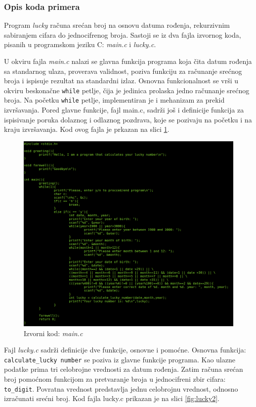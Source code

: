 \documentclass[12pt,oneside]{memoir}
\newcommand{\kod}[1]{\texttt{#1}}
\newcommand{\strano}[1]{\textit{#1}}
\begin{document}
\subsubsection{Opis koda primera}

Program \strano{lucky} računa srećan broj na osnovu datuma rođenja, rekurzivnim sabiranjem cifara do jednocifrenog broja. Sastoji se iz dva fajla izvornog koda, pisanih u programskom jeziku C: \strano{main.c} i \strano{lucky.c}. 

U okviru fajla \strano{main.c} nalazi se glavna funkcija programa koja čita datum rođenja sa standarnog ulaza, proverava validnost, poziva funkciju za računanje srećnog broja i ispisuje rezultat na standardni izlaz. Osnovna funkcionalnost se vrši u okviru beskonačne \kod{while} petlje, čija je jedinica prolaska jedno računanje srećnog broja. Na početku \kod{while} petlje, implementiran je i mehanizam za prekid izvršavanja. Pored glavne funkcije, fajl main.c, sadrži još i definicije funkcija za ispisivanje poruka dolaznog i odlaznog pozdrava, koje se pozivaju na početku i na kraju izvršavanja. Kod ovog fajla je prkazan na slici \ref{fig:lucky1}.

\begin{figure}[!ht]
  \centering
  \includegraphics[width=\textwidth]{img/main.png}
  \caption{Izvorni kod: \strano{main.c}}
  \label{fig:lucky1}
\end{figure}

Fajl \strano{lucky.c} sadrži definicije dve funkcije, osnovne i pomoćne. Osnovna funkcija: \kod{calculate\_lucky\ number} se poziva iz glavne funkcije programa. Kao ulazne podatke prima tri celobrojne vrednosti za datum rođenja. Zatim računa srećan broj pomoćnom funkcijom za pretvaranje broja u jednocifreni zbir cifara: \kod{to\_digit}. Povratna vrednost predstavlja jednu celobrojnu vrednost, odnosno izračunati srećni broj. Kod fajla lucky.c prikazan je na slici \ref{fig:lucky2}.
\end{document}
